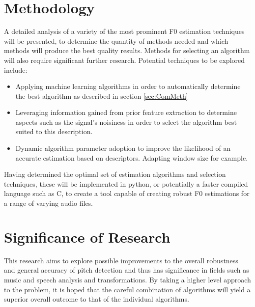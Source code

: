 \documentclass{scrartcl}
\begin{document}
    \section{Methodology}
        A detailed analysis of a variety of the most prominent F0 estimation
        techniques will be presented, to determine the quantity of methods
        needed and which methods will produce the best quality results. Methods
        for selecting an algorithm will also require significant further
        research.  Potential techniques to be explored include: 
        \begin{itemize}
            \item Applying machine learning algorithms in order to
                automatically determine the best algorithm as described in
                section \ref{sec:ComMeth}~\parencite{bogason2015ffesl}
            \item Leveraging information gained from prior feature extraction
                to determine aspects such as the signal's noisiness in order to
                select the algorithm best suited to this description.
            \item Dynamic algorithm parameter adoption to improve the likelihood
                of an accurate estimation based on descriptors. Adapting window
                size for example.~\parencite{liuni2012aasas}
        \end{itemize}
        Having determined the optimal set of estimation algorithms and
        selection techniques, these will be implemented in python, or
        potentially a faster compiled language such as C, to create a tool
        capable of creating robust F0 estimations for a range of varying audio
        files.
        
    \section{Significance of Research}
        This research aims to explore possible improvements to the overall
        robustness and general accuracy of pitch detection and thus has
        significance in fields such as music and speech analysis and
        transformations. By taking a higher level approach to the problem, it
        is hoped that the careful combination of algorithms will yield a
        superior overall outcome to that of the individual algorithms.
\end{document}
